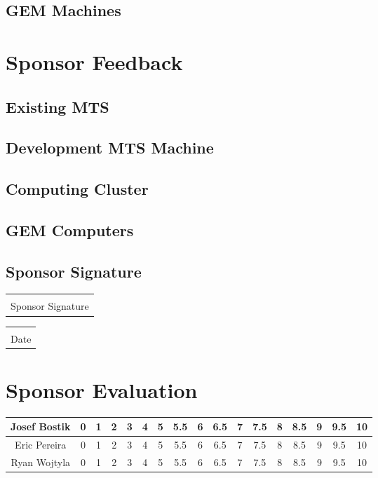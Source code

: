 \documentclass[12pt]{article}
\makeatletter
\newcommand\tab[1][1cm]{\hspace*{#1}}
\newcommand{\titledate}[2][2.5in]{%
	\noindent%
	\begin{tabular}{@{}p{#1}@{}}
		\\ \hline \\[-.75\normalbaselineskip]
		#2
	\end{tabular} \hspace{1in}
	\begin{tabular}{@{}p{#1}@{}}
		\\ \hline \\[-.75\normalbaselineskip]
		Date
	\end{tabular}
}
\makeatother
\begin{document}
\tab 

\subsection{GEM Machines}

\tab 

\section{Sponsor Feedback}

\subsection{Existing MTS}

\vspace{1in}

\subsection{Development MTS Machine}

\vspace{1in}

\subsection{Computing Cluster}

\vspace{1in}

\subsection{GEM Computers}

\vspace{1in}

\newpage

\subsection{Sponsor Signature}
\vspace{.5in}
 \titledate{Sponsor Signature}
 
\section{Sponsor Evaluation}
\begin{tabular}{|c|c|c|c|c|c|c|c|c|c|c|c|c|c|c|c|c|}
	\hline
	Josef Bostik & 0 & 1 & 2 & 3 & 4 & 5 & 5.5 & 6 & 6.5 & 7 & 7.5 & 8 & 8.5 & 9 & 9.5 & 10\\
	\hline
	Eric Pereira & 0 & 1 & 2 & 3 & 4 & 5 & 5.5 & 6 & 6.5 & 7 & 7.5 & 8 & 8.5 & 9 & 9.5 & 10\\
	\hline
	Ryan Wojtyla & 0 & 1 & 2 & 3 & 4 & 5 & 5.5 & 6 & 6.5 & 7 & 7.5 & 8 & 8.5 & 9 & 9.5 & 10\\
	\hline
\end{tabular}
\end{document}
